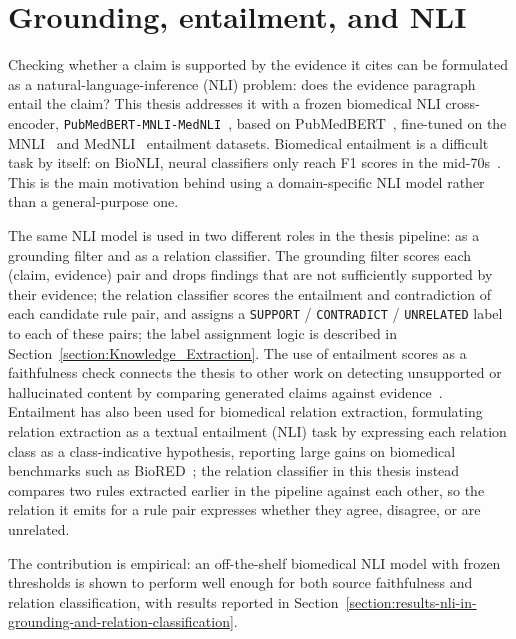 \section{Grounding, entailment, and NLI}\label{section:background-grounding-entailment-and-nli}

Checking whether a claim is supported by the evidence it cites can be formulated as a natural-language-inference (NLI) problem: does the evidence paragraph entail the claim? This thesis addresses it with a frozen biomedical NLI cross-encoder, \texttt{PubMedBERT-MNLI-MedNLI}~\parencite{deka2023pubmedbertextended}, based on PubMedBERT~\parencite{gu2021biomedbert}, fine-tuned on the MNLI~\parencite{williams2018mnli} and MedNLI~\parencite{romanov2018mednli} entailment datasets. Biomedical entailment is a difficult task by itself: on BioNLI, neural classifiers only reach F1 scores in the mid-70s~\parencite{bastan2022bionligeneratingbiomedical}. This is the main motivation behind using a domain-specific NLI model rather than a general-purpose one.

The same NLI model is used in two different roles in the thesis pipeline: as a grounding filter and as a relation classifier. The grounding filter scores each (claim, evidence) pair and drops findings that are not sufficiently supported by their evidence; the relation classifier scores the entailment and contradiction of each candidate rule pair, and assigns a \texttt{SUPPORT} / \texttt{CONTRADICT} / \texttt{UNRELATED} label to each of these pairs; the label assignment logic is described in Section~\ref{section:Knowledge_Extraction}. The use of entailment scores as a faithfulness check connects the thesis to other work on detecting unsupported or hallucinated content by comparing generated claims against evidence~\parencite{honovich2022truereevaluatingfactual, rashkin2023measuringattributionnatural, huang2025surveyhallucinationlarge}. Entailment has also been used for biomedical relation extraction, formulating relation extraction as a textual entailment (NLI) task by expressing each relation class as a class-indicative hypothesis, reporting large gains on biomedical benchmarks such as BioRED~\parencite{hogan2025entangledrelationsleveraging}; the relation classifier in this thesis instead compares two rules extracted earlier in the pipeline against each other, so the relation it emits for a rule pair expresses whether they agree, disagree, or are unrelated.

The contribution is empirical: an off-the-shelf biomedical NLI model with frozen thresholds is shown to perform well enough for both source faithfulness and relation classification, with results reported in Section~\ref{section:results-nli-in-grounding-and-relation-classification}.
